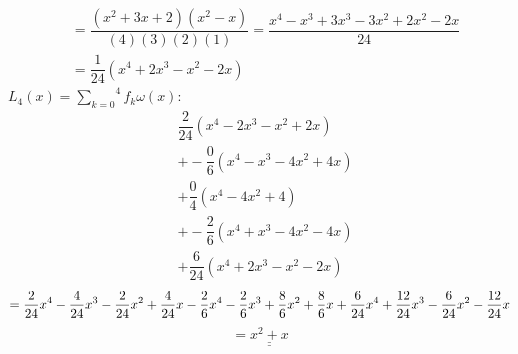 \documentclass[a4paper,10pt]{article}
\begin{document}
\begin{enumerate}[a)]
\begin{align*}
			& = \dfrac{(x^2 + 3x  + 2)(x^2 - x)}{(4)(3)(2)(1)} = \dfrac{x^4 - x^3 + 3x^3 -3x^2 + 2x^2 - 2x}{24}\\
			& = \dfrac{1}{24}(x^4 + 2x^3 - x^2 - 2x)
		\end{align*}
		$L_4(x) = \overset{4}{\underset{k = 0}{\sum}}f_k \omega(x)$:\\
		\begin{align*}
		 & \dfrac{2}{24}(x^4 - 2x^3 -x^2 + 2x)\\
		 & + -\dfrac{0}{6}(x^4 - x^3 - 4x^2 + 4x)\\
		 & + \dfrac{0}{4}(x^4 - 4x^2 + 4)\\
		 & + -\dfrac{2}{6}(x^4 + x^3 - 4x^2 - 4x)\\
		 & + \dfrac{6}{24}(x^4 + 2x^3 - x^2 - 2x)
		 \end{align*}
		 \[
		 = \dfrac{2}{24}x^4 - \dfrac{4}{24}x^3 - \dfrac{2}{24}x^2 + \dfrac{4}{24}x - \dfrac{2}{6}x^4 - \dfrac{2}{6}x^3 + \dfrac{8}{6}x^2 + \dfrac{8}{6}x + \dfrac{6}{24}x^4 + \dfrac{12}{24}x^3 - \dfrac{6}{24}x^2 - \dfrac{12}{24}x\\
		 \]
		 \[
		 = \underline{\underline{x^2 + x}}
		 \]
		
		
	\end{enumerate}
	
	
\end{document}
